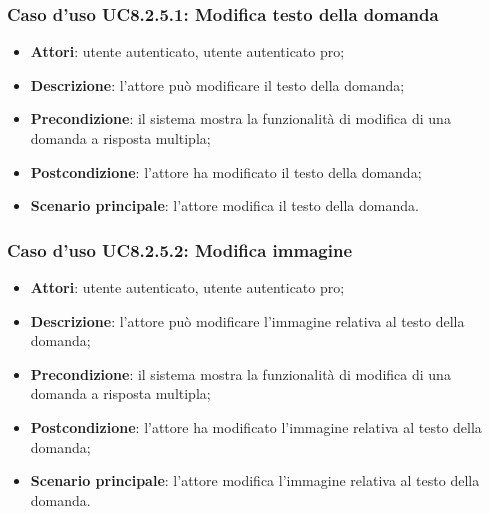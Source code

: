 \subsubsection{Caso d'uso UC8.2.5.1: Modifica testo della domanda}
	\begin{itemize}
		\item
			\textbf{Attori}: utente autenticato, utente autenticato pro;
		\item		
			\textbf{Descrizione}: l'attore può modificare il testo della domanda;
		\item
			\textbf{Precondizione}: il sistema mostra la funzionalità di modifica di una domanda a risposta multipla;
		\item
			\textbf{Postcondizione}: l'attore ha modificato il testo della domanda;
		\item
			\textbf{Scenario principale}: l'attore modifica il testo della domanda. 
	 			
	\end{itemize}
	
\subsubsection{Caso d'uso UC8.2.5.2: Modifica immagine}
	\begin{itemize}
		\item
			\textbf{Attori}: utente autenticato, utente autenticato pro;
		\item		
			\textbf{Descrizione}: l'attore può modificare l'immagine relativa al testo della domanda;
		\item
			\textbf{Precondizione}: il sistema mostra la funzionalità di modifica di una domanda a risposta multipla;
		\item
			\textbf{Postcondizione}: l'attore ha modificato l'immagine relativa al testo della domanda;
		\item
			\textbf{Scenario principale}: l'attore modifica l'immagine relativa al testo della domanda. 	
	\end{itemize}
	
	
